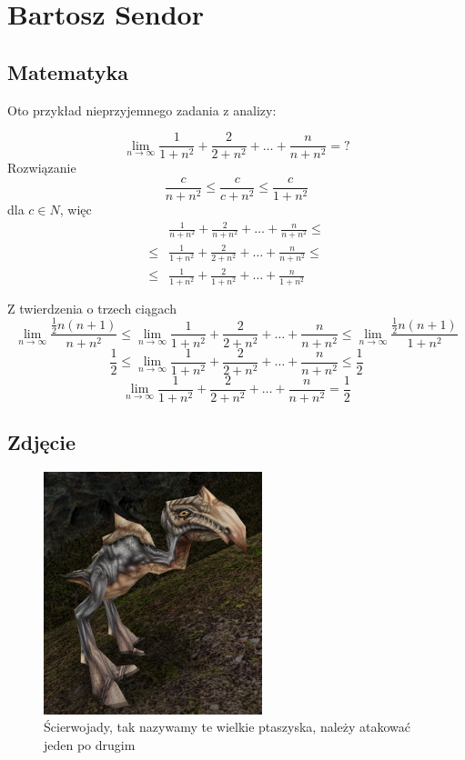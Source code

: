 \clearpage
\section{Bartosz Sendor}

\subsection{Matematyka}
Oto przykład nieprzyjemnego zadania z analizy:

        \[\lim_{n\to\infty} \frac{1}{1+n^2}+\frac{2}{2+n^2}+\dots+\frac{n}{n+n^2}=?\]
Rozwiązanie
        \[ \frac{c}{n+n^2} \leq \frac{c}{c+n^2} \leq \frac{c}{1+n^2} \]
        dla \(c \in N\), więc
\begin{align*}
    & \frac{1}{n+n^2}+\frac{2}{n+n^2}+\dots+\frac{n}{n+n^2} \leq \\
    \leq & \frac{1}{1+n^2}+\frac{2}{2+n^2}+\dots+\frac{n}{n+n^2} \leq \\
    \leq & \frac{1}{1+n^2}+\frac{2}{1+n^2}+\dots+\frac{n}{1+n^2}\\\\
\end{align*}
Z twierdzenia o trzech ciągach
    \[\lim_{n\to\infty} \frac{\frac{1}{2}n(n+1)}{n+n^2} \leq
    \lim_{n\to\infty} \frac{1}{1+n^2}+\frac{2}{2+n^2}+\dots+\frac{n}{n+n^2} \leq
    \lim_{n\to\infty} \frac{\frac{1}{2}n(n+1)}{1+n^2} \]
    \[\frac{1}{2} \leq
    \lim_{n\to\infty} \frac{1}{1+n^2}+\frac{2}{2+n^2}+\dots+\frac{n}{n+n^2} \leq
    \frac{1}{2}\]
    \[\lim_{n\to\infty} \frac{1}{1+n^2}+\frac{2}{2+n^2}+\dots+\frac{n}{n+n^2}=\frac{1}{2}\]




\subsection{Zdjęcie}
\label{fig: scierwojad}

\begin{figure}[h]
    \centering
    \includegraphics[height = 200pt]{pictures/BartekSendor.png}
    \caption{Ścierwojady, tak nazywamy te wielkie ptaszyska, należy atakować jeden po drugim}
\end{figure}

